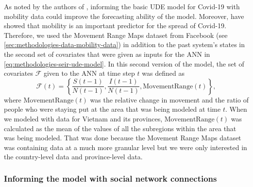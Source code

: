 As noted by the authors of \cite{dandekarMachineLearningAidedGlobal2020a}, informing the basic \gls{UDE} model for Covid-19 with mobility data could improve the forecasting ability of the model.
Moreover, \cite{changMobilityNetworkModels2021,ihmecovid-19forecastingteamModelingCOVID19Scenarios2021,liSubstantialUndocumentedInfection2020} have showed that mobility is an important predictor for the spread of Covid-19.
Therefore, we used the Movement Range Maps dataset from Facebook (see \autoref{sec:methodologies-data-mobility-data}) in addition to the past system's states in the second set of covariates that were given as inputs for the \gls{ANN} in \autoref{eq:methodologies-seir-ude-model}.
In this second version of the model, the set of covariates $\mathcal{F}$ given to the \gls{ANN} at time step $t$ was defined as
\begin{equation*}
    \mathcal{F}(t) = \left\lbrace \frac{S(t-1)}{N(t-1)}, \frac{I(t-1)}{N(t-1)}, \text{MovementRange}(t) \right\rbrace,
\end{equation*}
where $\text{MovementRange}(t)$ was the relative change in movement and the ratio of people who were staying put at the area that was being modeled at time $t$.
When we modeled with data for Vietnam and its provinces, $\text{MovementRange}(t)$ was calculated as the mean of the values of all the subregions within the area that was being modeled.
That was done because the Movement Range Maps dataset was containing data at a much more granular level but we were only interested in the country-level data and province-level data.

\subsubsection{Informing the model with social network connections}

